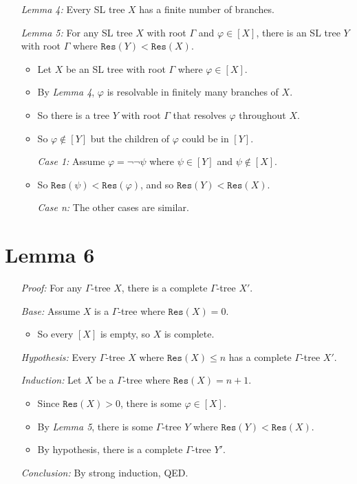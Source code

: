 \documentclass[a4paper, 11pt]{article} %
\newcommand{\set}[1]{\lbrace#1\rbrace} %
\newcommand{\res}{\texttt{Res}}
\begin{document}
\begin{enumerate}
  \item[\it Lemma 4:] Every SL tree $X$ has a finite number of branches.  
  \item[\it Lemma 5:] For any SL tree $X$ with root $\Gamma$ and $\varphi\in[X]$, there is an SL tree $Y$ with root $\Gamma$ where $\res(Y)<\res(X)$. 
    \begin{itemize}
      \item Let $X$ be an SL tree with root $\Gamma$ where $\varphi\in[X]$. 
      \item By \textit{Lemma 4}, $\varphi$ is resolvable in finitely many branches of $X$. 
      \item So there is a tree $Y$ with root $\Gamma$ that resolves $\varphi$ throughout $X$. 
      \item So $\varphi\notin[Y]$ but the children of $\varphi$ could be in $[Y]$.
      \item[\it Case 1:] Assume $\varphi=\neg\neg\psi$ where $\psi\in[Y]$ and $\psi\notin[X]$.
      \item So $\res(\psi)<\res(\varphi)$, and so $\res(Y)<\res(X)$.
      \item[\it Case n:] The other cases are similar. 
    \end{itemize}
\end{enumerate}








\section*{Lemma 6}

\begin{enumerate}
  \item[\it Proof:] For any $\Gamma$-tree $X$, there is a complete $\Gamma$-tree $X'$.  
  \item[\it Base:] Assume $X$ is a $\Gamma$-tree where $\res(X)=0$.
    \begin{itemize}
      \item So every $[X]$ is empty, so $X$ is complete. 
    \end{itemize}
  \item[\it Hypothesis:] Every $\Gamma$-tree $X$ where $\res(X)\leq n$ has a complete $\Gamma$-tree $X'$.
  \item[\it Induction:] Let $X$ be a $\Gamma$-tree where $\res(X)=n+1$.
    \begin{itemize}
      \item Since $\res(X)>0$, there is some $\varphi\in[X]$.
      \item By \textit{Lemma 5}, there is some $\Gamma$-tree $Y$ where $\res(Y)<\res(X)$.
      \item By hypothesis, there is a complete $\Gamma$-tree $Y'$.
    \end{itemize}
  \item[\it Conclusion:] By strong induction, QED.
\end{enumerate}
\end{document}
